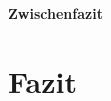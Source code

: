 \documentclass[12pt,a4paper]{article}
\begin{document}
\paragraph{Zwischenfazit}


\section{Fazit}
\end{document}

